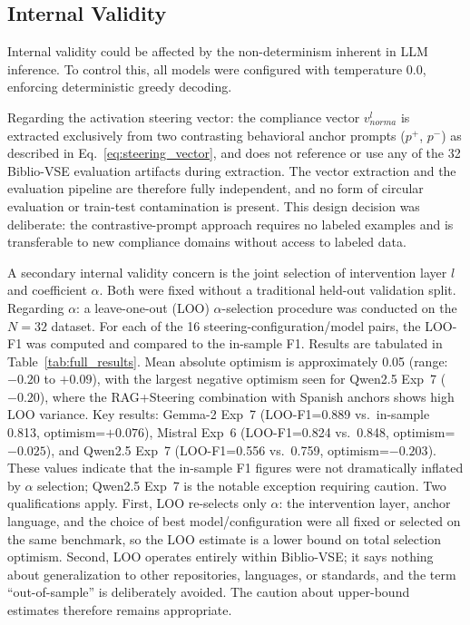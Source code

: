 \documentclass{ieeeaccess}
\begin{document}
\subsection{Internal Validity}

Internal validity could be affected by the non-determinism inherent in LLM inference. To control this, all models were configured with temperature 0.0, enforcing deterministic greedy decoding.

Regarding the activation steering vector: the compliance vector $v_{norma}^l$ is extracted exclusively from two contrasting behavioral anchor prompts ($p^+$, $p^-$) as described in Eq.~\ref{eq:steering_vector}, and does not reference or use any of the 32 Biblio-VSE evaluation artifacts during extraction. The vector extraction and the evaluation pipeline are therefore fully independent, and no form of circular evaluation or train-test contamination is present. This design decision was deliberate: the contrastive-prompt approach requires no labeled examples and is transferable to new compliance domains without access to labeled data.

A secondary internal validity concern is the joint selection of intervention layer $l$ and coefficient $\alpha$. Both were fixed without a traditional held-out validation split. Regarding $\alpha$: a leave-one-out (LOO) $\alpha$-selection procedure was conducted on the $N=32$ dataset. For each of the 16 steering-configuration/model pairs, the LOO-F1 was computed and compared to the in-sample F1. Results are tabulated in Table~\ref{tab:full_results}. Mean absolute optimism is approximately 0.05 (range: $-0.20$ to $+0.09$), with the largest negative optimism seen for Qwen2.5 Exp~7 ($-0.20$), where the RAG+Steering combination with Spanish anchors shows high LOO variance. Key results: Gemma-2 Exp~7 (LOO-F1=0.889 vs.\ in-sample 0.813, optimism=$+0.076$), Mistral Exp~6 (LOO-F1=0.824 vs.\ 0.848, optimism=$-0.025$), and Qwen2.5 Exp~7 (LOO-F1=0.556 vs.\ 0.759, optimism=$-0.203$). These values indicate that the in-sample F1 figures were not dramatically inflated by $\alpha$ selection; Qwen2.5 Exp~7 is the notable exception requiring caution. Two qualifications apply. First, LOO re-selects only $\alpha$: the intervention layer, anchor language, and the choice of best model/configuration were all fixed or selected on the same benchmark, so the LOO estimate is a lower bound on total selection optimism. Second, LOO operates entirely within Biblio-VSE; it says nothing about generalization to other repositories, languages, or standards, and the term ``out-of-sample'' is deliberately avoided. The caution about upper-bound estimates therefore remains appropriate.
\end{document}
